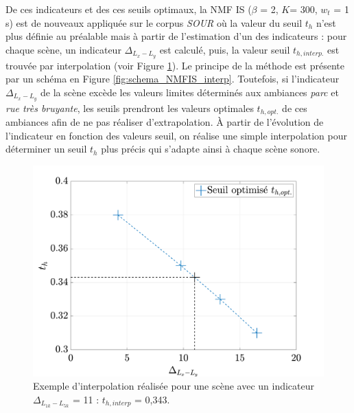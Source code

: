 De ces indicateurs et des ces seuils optimaux, la NMF IS ($\beta$ = 2, $K$= 300, $w_t$ = 1 s) est de nouveaux appliquée sur le corpus \textit{SOUR} où la valeur du seuil $t_h$ n'est plus définie au préalable mais à partir de l'estimation d'un des indicateurs : pour chaque scène, un indicateur $\Delta_{L_x-L_y}$ est calculé, puis, la valeur seuil $t_{h,interp.}$ est trouvée par interpolation (voir Figure \ref{fig:interpolation}). Le principe de la méthode est présente par un schéma en Figure \ref{fig:schema_NMFIS_interp}.
Toutefois, si l'indicateur $\Delta_{L_x-L_y}$ de la scène excède les valeurs limites déterminés aux ambiances \textit{parc} et \textit{rue très bruyante}, les seuils prendront les valeurs optimales $t_{h,opt.}$ de ces ambiances afin de ne pas réaliser d'extrapolation.  À partir de l'évolution de l'indicateur en fonction des valeurs seuil, on réalise une simple interpolation pour déterminer un seuil $t_h$ plus précis qui s'adapte ainsi à chaque scène sonore.


\begin{figure}[h]
\centering
\includegraphics[width=.7\linewidth]{./figures/resultats/interpolationOpt.pdf}
\caption{Exemple d'interpolation réalisée pour une scène avec un indicateur $\Delta_{L_{1k}-L_{5k}}$ = 11 : $t_{h,interp}$ = 0,343.}
\label{fig:interpolation}
\end{figure}

